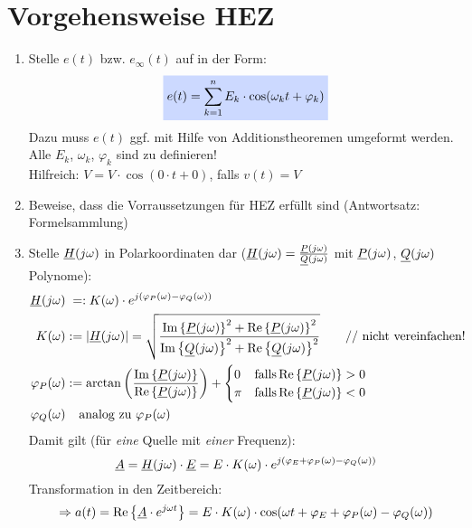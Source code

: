 \clearpage
\section{Vorgehensweise HEZ}

\begin{enumerate}
  \item Stelle $e(t)$ bzw. $e_\infty(t)$ auf in der Form:
    \[\colorbox{emphlight}{$\displaystyle e(t)=\sum_{k=1}^n E_k \cdot\cos(\omega_k t+\varphi_k)$}\]
    Dazu muss $e(t)$ ggf. mit Hilfe von Additionstheoremen umgeformt werden.
    Alle $E_k$, $\omega_k$, $\varphi_k$ sind zu definieren!\\
    Hilfreich: $V=V\cdot \cos(0\cdot t+0)$, falls $v(t) = V$

  \item Beweise, dass die Vorraussetzungen für HEZ erfüllt sind
    (Antwortsatz: Formelsammlung)

  \item Stelle $\underline{H}(j\omega)$ in Polarkoordinaten dar
    ($\underline{H}(j\omega)=\frac{\underline{P}(j\omega)}{\underline{Q}(j\omega)}$ mit $\underline{P}(j\omega)$,
    $\underline{Q}(j\omega)$ Polynome):
    \begin{align*}
      \underline{H}(j\omega)&\phantom{:}=:K(\omega)
        \cdot e^{j(\varphi_P(\omega)-\varphi_Q(\omega))}\\
      K(\omega) &:= |\underline{H}(j\omega)|
        = \sqrt{\frac{\operatorname{Im}\left\{\underline{P}(j\omega)\right\}^2 + \operatorname{Re}\left\{\underline{P}(j\omega)\right\}^2}
        {\operatorname{Im}\left\{\underline{Q}(j\omega)\right\}^2 + \operatorname{Re}\left\{\underline{Q}(j\omega)\right\}^2}}
        \qquad \text{// nicht vereinfachen!}\\
      \varphi_{P}(\omega)
        &:= \arctan\left({\frac{\operatorname{Im}\left\{\underline{P}(j\omega)\right\}}{\operatorname{Re}\left\{\underline{P}(j\omega)\right\}}}\right) +
        \begin{cases}
          0   &\text{falls} \operatorname{Re}\left\{\underline{P}(j\omega)\right\} > 0 \\
          \pi &\text{falls} \operatorname{Re}\left\{\underline{P}(j\omega)\right\} < 0
        \end{cases}\\
      \varphi_Q(\omega) &\phantom{:=} \text{analog zu } \varphi_P(\omega)
    \end{align*}
    Damit gilt (für \emph{eine} Quelle mit \emph{einer} Frequenz):
    \[\underline{A}=\underline{H}(j\omega)\cdot \underline{E}
      = E\cdot K(\omega)
        \cdot e^{j(\varphi_E+\varphi_P(\omega)-\varphi_Q(\omega))}\]
    Transformation in den Zeitbereich:
    \[\Rightarrow a(t) = \operatorname{Re}\left\{\underline{A}\cdot e^{j\omega t}\right\}
      = E \cdot K(\omega)
        \cdot \cos(\omega t+\varphi_E+\varphi_P(\omega)-\varphi_Q(\omega))\]



\end{enumerate}
